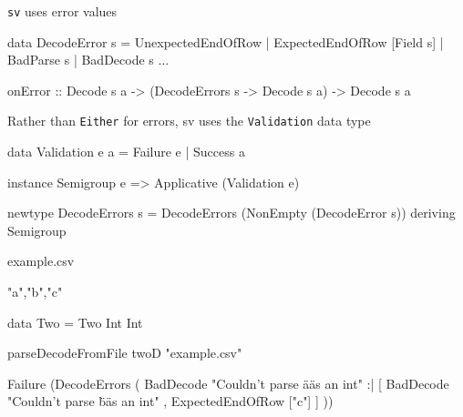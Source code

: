 \documentclass[UKenglish,usenames,dvipsnames,svgnames,table,aspectratio=169,mathserif]{beamer}
\newcommand{\nl}{\vspace{\baselineskip}}
\newcommand{\pnl}{\pause \nl}
\begin{document}
\begin{frame}[fragile]

{\tt sv} uses error values

\nl

\begin{haskellcode}
data DecodeError s
  = UnexpectedEndOfRow
  | ExpectedEndOfRow [Field s]
  | BadParse s
  | BadDecode s
  ...
\end{haskellcode}

\end{frame}


\begin{frame}[fragile]
\begin{haskellcode}
onError :: Decode s a
        -> (DecodeErrors s -> Decode s a)
        -> Decode s a
\end{haskellcode}
\end{frame}


\begin{frame}[fragile]
Rather than {\tt Either} for errors, sv uses the {\tt Validation} data type

\nl

\begin{haskellcode}
data Validation e a = Failure e | Success a
\end{haskellcode}

\pnl

\begin{haskellcode}
instance Semigroup e => Applicative (Validation e)
\end{haskellcode}

\pnl

\begin{haskellcode}
newtype DecodeErrors s =
  DecodeErrors (NonEmpty (DecodeError s))
  deriving Semigroup
\end{haskellcode}
\end{frame}


\begin{frame}[fragile]
\begin{block}{example.csv}
\begin{haskellcode}
"a","b","c"
\end{haskellcode}
\end{block}
\pnl
\begin{haskellcode}
data Two = Two Int Int
\end{haskellcode}
\pnl
{}
\pnl
\begin{haskellcode}
parseDecodeFromFile twoD "example.csv"
\end{haskellcode}
\pnl

\begin{block}

\begin{haskellcode}
Failure (DecodeErrors (
    BadDecode "Couldn't parse \"a\" as an int" :|
  [ BadDecode "Couldn't parse \"b\" as an int"
  , ExpectedEndOfRow ["c"]
  ]
))
\end{haskellcode}
\end{block}
\end{frame}
\end{document}
